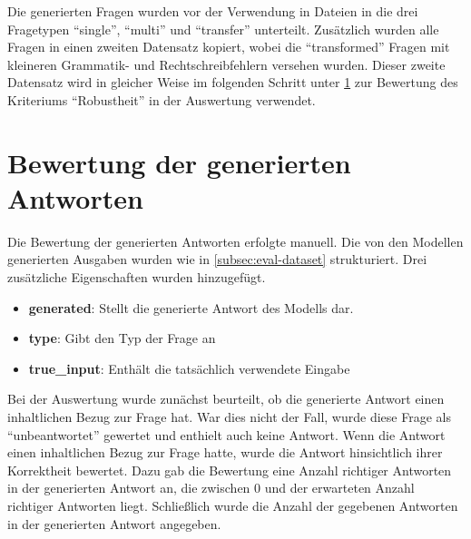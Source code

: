Die generierten Fragen wurden vor der Verwendung in Dateien in die drei Fragetypen \enquote{single}, \enquote{multi} und \enquote{transfer} unterteilt.
Zusätzlich wurden alle Fragen in einen zweiten Datensatz kopiert, wobei die \enquote{transformed} Fragen mit kleineren Grammatik- und Rechtschreibfehlern versehen wurden.
Dieser zweite Datensatz wird in gleicher Weise im folgenden Schritt unter \cref{sec:answer-rating} zur Bewertung des Kriteriums \enquote{Robustheit} in der Auswertung verwendet.

\section{Bewertung der generierten Antworten}\label{sec:answer-rating}
Die Bewertung der generierten Antworten erfolgte manuell.
Die von den Modellen generierten Ausgaben wurden wie in \cref{subsec:eval-dataset} strukturiert. Drei zusätzliche Eigenschaften wurden hinzugefügt.
\begin{itemize}
    \item \textbf{generated}: Stellt die generierte Antwort des Modells dar.
    \item \textbf{type}: Gibt den Typ der Frage an
    \item \textbf{true\_input}: Enthält die tatsächlich verwendete Eingabe
\end{itemize}

Bei der Auswertung wurde zunächst beurteilt, ob die generierte Antwort einen inhaltlichen Bezug zur Frage hat.
War dies nicht der Fall, wurde diese Frage als \enquote{unbeantwortet} gewertet und enthielt auch keine Antwort.
Wenn die Antwort einen inhaltlichen Bezug zur Frage hatte, wurde die Antwort hinsichtlich ihrer Korrektheit bewertet.
Dazu gab die Bewertung eine Anzahl richtiger Antworten in der generierten Antwort an, die zwischen 0 und der erwarteten Anzahl richtiger Antworten liegt.
Schließlich wurde die Anzahl der gegebenen Antworten in der generierten Antwort angegeben.\\

